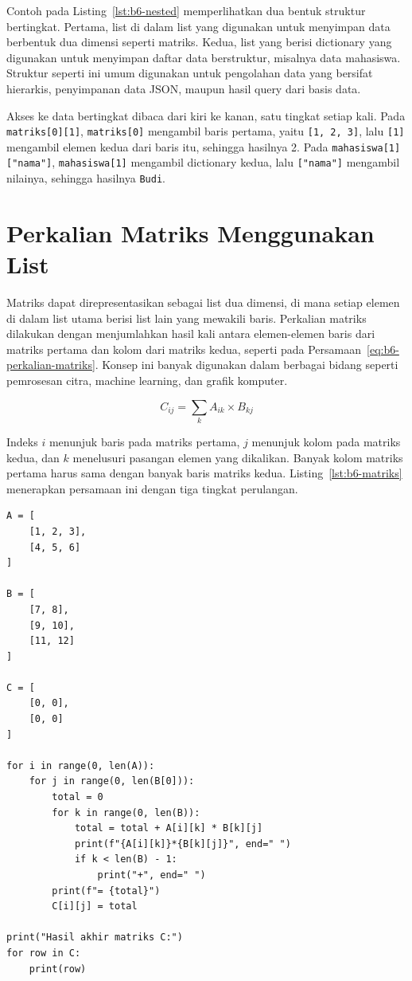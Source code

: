 Contoh pada Listing~\ref{lst:b6-nested} memperlihatkan dua bentuk struktur bertingkat. 
Pertama, list di dalam list yang digunakan untuk menyimpan data berbentuk dua dimensi seperti matriks. 
Kedua, list yang berisi dictionary yang digunakan untuk menyimpan daftar data berstruktur, misalnya data mahasiswa. 
Struktur seperti ini umum digunakan untuk pengolahan data yang bersifat hierarkis, penyimpanan data JSON, maupun hasil query dari basis data.

Akses ke data bertingkat dibaca dari kiri ke kanan, satu tingkat setiap kali. Pada \texttt{matriks[0][1]}, \texttt{matriks[0]} mengambil baris pertama, yaitu \texttt{[1, 2, 3]}, lalu \texttt{[1]} mengambil elemen kedua dari baris itu, sehingga hasilnya 2. Pada \texttt{mahasiswa[1]["nama"]}, \texttt{mahasiswa[1]} mengambil dictionary kedua, lalu \texttt{["nama"]} mengambil nilainya, sehingga hasilnya \texttt{Budi}.

\section{Perkalian Matriks Menggunakan List}
Matriks dapat direpresentasikan sebagai list dua dimensi, di mana setiap elemen di dalam list utama berisi list lain yang mewakili baris. 
Perkalian matriks dilakukan dengan menjumlahkan hasil kali antara elemen-elemen baris dari matriks pertama dan kolom dari matriks kedua, seperti pada Persamaan~\eqref{eq:b6-perkalian-matriks}. 
Konsep ini banyak digunakan dalam berbagai bidang seperti pemrosesan citra, machine learning, dan grafik komputer.

\begin{equation}
  C_{ij} = \sum_{k} A_{ik} \times B_{kj}
  \label{eq:b6-perkalian-matriks}
\end{equation}

Indeks $i$ menunjuk baris pada matriks pertama, $j$ menunjuk kolom pada matriks kedua, dan $k$ menelusuri pasangan elemen yang dikalikan. Banyak kolom matriks pertama harus sama dengan banyak baris matriks kedua. Listing~\ref{lst:b6-matriks} menerapkan persamaan ini dengan tiga tingkat perulangan.

\begin{lstlisting}[style=PythonStyle, caption={Perkalian dua matriks dengan perulangan bertingkat}, label={lst:b6-matriks}]
A = [
    [1, 2, 3],
    [4, 5, 6]
]

B = [
    [7, 8],
    [9, 10],
    [11, 12]
]

C = [
    [0, 0],
    [0, 0]
]

for i in range(0, len(A)):
    for j in range(0, len(B[0])):
        total = 0
        for k in range(0, len(B)):
            total = total + A[i][k] * B[k][j]
            print(f"{A[i][k]}*{B[k][j]}", end=" ")
            if k < len(B) - 1:
                print("+", end=" ")
        print(f"= {total}")
        C[i][j] = total

print("Hasil akhir matriks C:")
for row in C:
    print(row)
\end{lstlisting}

